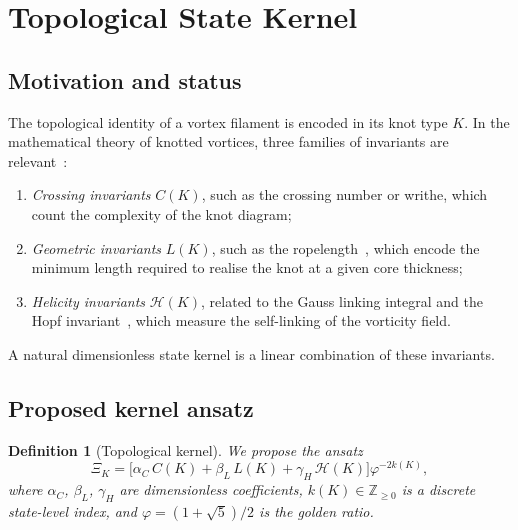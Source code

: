 \documentclass[11pt, a4paper]{article}
\newtheorem{definition}{Definition}
\begin{document}
\section{Topological State Kernel}
\label{sec:topo}

\subsection{Motivation and status}
\label{sec:topo_status}

The topological identity of a vortex filament is encoded in
its knot type $K$.
In the mathematical theory of knotted vortices, three families
of invariants are relevant~\cite{Moffatt1969,Ricca2008,Kauffman2001}:
\begin{enumerate}[label=(\roman*)]
  \item \emph{Crossing invariants} $C(K)$, such as the
        crossing number or writhe, which count the complexity of
        the knot diagram;
  \item \emph{Geometric invariants} $L(K)$, such as the
        ropelength~\cite{CantarellaKusner2002}, which encode
        the minimum length required to realise the knot at a
        given core thickness;
  \item \emph{Helicity invariants} $\mathcal{H}(K)$, related
        to the Gauss linking integral and the Hopf
        invariant~\cite{Moffatt1969,Arnold1966}, which measure
        the self-linking of the vorticity field.
\end{enumerate}
A natural dimensionless state kernel is a linear combination
of these invariants.

\subsection{Proposed kernel ansatz}
\label{sec:topo_ansatz}

\begin{definition}[Topological kernel]
\label{def:kernel}
We propose the ansatz
\begin{equation}
  \Xi_K
  = \bigl[\alpha_C\,C(K) + \beta_L\,L(K) + \gamma_H\,\mathcal{H}(K)\bigr]
    \varphi^{-2k(K)},
  \label{eq:Xik}
\end{equation}
where $\alpha_C$, $\beta_L$, $\gamma_H$ are dimensionless
coefficients, $k(K) \in \mathbb{Z}_{\geq 0}$ is a discrete
state-level index, and $\varphi = (1+\sqrt{5})/2$ is the
golden ratio.
\end{definition}
\end{document}

